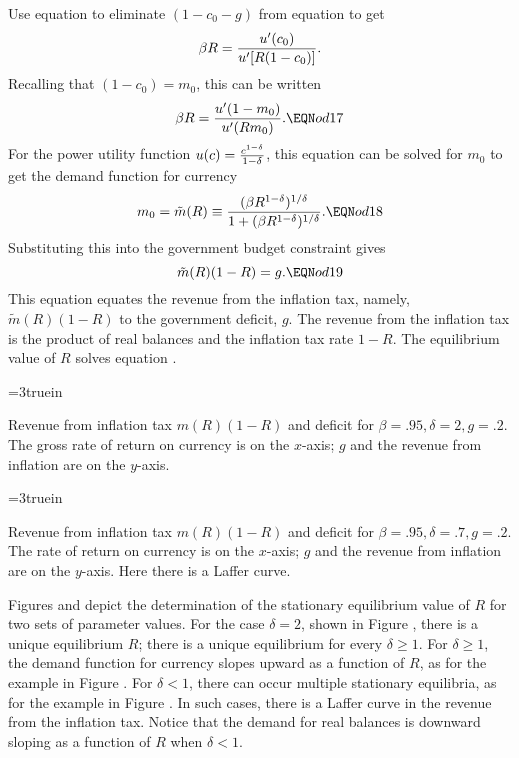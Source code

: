 Use equation  to eliminate $(1-c_0-g)$ from equation  to get
$$ \beta R = {u'(c_0) \over u'[R(1-c_0)] } .$$
Recalling that $(1-c_0) = m_0$, this can be
written
$$ \beta R ={u'(1-  m_0) \over u'(R  m_0)}.\EQN od17$$
For the power utility function $u(c)={c^{1-\delta} \over 1-\delta}$,
this equation can be solved for $m_0$ to get the demand function
for currency
$$ m_0 = \tilde m(R) \equiv{(\beta R^{1-\delta})^{1/\delta} \over 1 +
       (\beta R^{1-\delta})^{1/\delta}} .\EQN od18$$
Substituting this into the government budget constraint  gives
$$ \tilde m(R)(1-R) = g . \EQN od19 $$
This equation equates the revenue from the inflation
tax, namely, $\tilde m(R)(1-R)$ to the government deficit, $g$.
The revenue from the inflation tax is the product of
real balances and the inflation tax rate $1-R$.  The equilibrium value
of $R$ solves equation .


\centerline{\epsfxsize=3truein}
\caption{Revenue from inflation tax  $m(R)(1-R)$ and deficit
for $\beta=.95, \delta=2, g=.2$.  The gross rate of return on currency is
on the $x$-axis;  $g$ and the revenue from inflation  are on the $y$-axis.}
\endfigure

\centerline{\epsfxsize=3truein}
\caption{Revenue from inflation tax $m(R)(1-R)$ and deficit for
$\beta=.95, \delta=.7, g=.2$.  The rate of return on currency is on the
$x$-axis;   $g$ and the revenue from inflation are on the $y$-axis.  Here
there is a Laffer curve.}
\endfigure

Figures  and  %
 depict the determination of the stationary
equilibrium value of $R$ for two sets of parameter values.  For
the case $\delta=2$, shown in Figure , %
 there is a unique
equilibrium $R$; there is a unique equilibrium for every
$\delta \geq 1$.  For $\delta \geq 1$, the demand function for
currency slopes upward as a function of $R$, as for the example in
Figure .  %
 For $\delta <1$, there can occur multiple stationary
equilibria, as for the example in Figure . %
  In such cases, there
is a Laffer curve in the revenue from the inflation tax.  Notice
that the demand for real balances is downward sloping as a
function of $R$ when $\delta < 1$.

